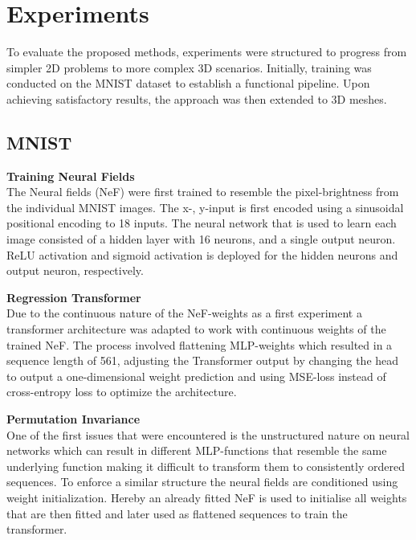 \section{Experiments}
\label{sec:exper}
To evaluate the proposed methods, experiments were structured to progress from simpler 2D problems to more complex 3D scenarios. Initially, training was conducted on the MNIST dataset to establish a functional pipeline. Upon achieving satisfactory results, the approach was then extended to 3D meshes.

\subsection*{MNIST }
\textbf{Training Neural Fields}\\
The Neural fields (NeF) were first trained to resemble the pixel-brightness from the individual MNIST images. The x-, y-input is first encoded using a sinusoidal positional encoding to 18 inputs. The neural network that is used to learn each image consisted of a hidden layer with 16 neurons, and a single output neuron. ReLU activation and sigmoid activation is deployed for the hidden neurons and output neuron, respectively.
\vspace{1em}

\noindent
\textbf{Regression Transformer }\\
Due to the continuous nature of the NeF-weights as a first experiment a transformer architecture was adapted to work with continuous weights of the trained NeF. The process involved flattening MLP-weights which resulted in a sequence length of 561, adjusting the Transformer output by changing the head to output a one-dimensional weight prediction and using MSE-loss instead of cross-entropy loss to optimize the architecture.
\vspace{1em}

\noindent
\textbf{Permutation Invariance}\\
One of the first issues that were encountered is the unstructured nature on neural networks which can result in different MLP-functions that resemble the same underlying function \cite{HechtNielsen1990ONTA} making it difficult to transform them to consistently ordered sequences. To enforce a similar structure the neural fields are conditioned using weight initialization. Hereby an already fitted NeF is used to initialise all weights that are then fitted and later used as flattened sequences to train the transformer.
\vspace{1em}

